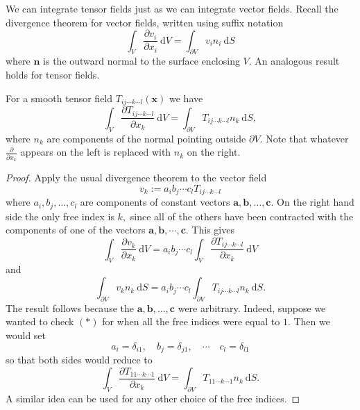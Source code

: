 We can integrate tensor fields just as we can integrate vector fields. Recall the divergence theorem for vector fields, written using suffix notation
\[
\int_{V} \frac{\partial v_{i}}{\partial x_{i}} \mathrm{~d} V=\int_{\partial V} v_{i} n_{i} \mathrm{~d} S
\]
where $\mathbf{n}$ is the outward normal to the surface enclosing $V$. An analogous result holds for
tensor fields.
\begin{proposition}
    For a smooth tensor field $T_{i j \cdots k \cdots l}(\mathbf{x})$ we have
    \[
    \int_{V} \frac{\partial T_{i j \cdots k \cdots l}}{\partial x_{k}} \mathrm{~d} V=\int_{\partial V} T_{i j \cdots k \cdots l} n_{k} \mathrm{~d} S,\tag{$*$}
    \]
    where $ n_k $ are components of the normal pointing outside $ \partial V $. Note that whatever $\frac{\partial}{\partial x_{k}}$ appears on the left is replaced with $n_{k}$ on the right.
\end{proposition}
\begin{proof}
    Apply the usual divergence theorem to the vector field
    \[
    v_{k}:=a_{i} b_{j} \cdots c_{l} T_{i j \cdots k \cdots l}
    \]
    where $a_{i}, b_{j}, \ldots, c_{l}$ are components of constant vectors $\mathbf{a}, \mathbf{b}, \ldots, \mathbf{c} .$ On the right hand side the only free index is $k,$ since all of the others have been contracted with the components of one of the vectors $\mathbf{a}, \mathbf{b}, \cdots, \mathbf{c}$. This gives
    \[
    \int_{V} \frac{\partial v_{k}}{\partial x_{k}} \mathrm{~d} V=a_{i} b_{j} \cdots c_{l} \int_{V} \frac{\partial T_{i j \cdots k \cdots l}}{\partial x_{k}} \mathrm{~d} V
    \]
    and
    \[
    \int_{\partial V} v_{k} n_{k} \mathrm{~d} S=a_{i} b_{j} \cdots c_{l} \int_{\partial V} T_{i j \cdots k \cdots l} n_{k} \mathrm{~d} S .
    \]
    The result follows because the $\mathbf{a}, \mathbf{b}, \ldots, \mathbf{c}$ were arbitrary. Indeed, suppose we wanted to check $(*)$ for when all the free indices were equal to $1 .$ Then we would set
    \[
    a_{i}=\delta_{i 1}, \quad b_{j}=\delta_{j 1}, \quad \cdots \quad c_{l}=\delta_{l 1}
    \]
    so that both sides would reduce to
    \[
    \int_{V} \frac{\partial T_{11 \cdots k \cdots 1}}{\partial x_{k}} \mathrm{~d} V=\int_{\partial V} T_{11 \cdots k \cdots 1} n_{k} \mathrm{~d} S .
    \]
    A similar idea can be used for any other choice of the free indices.
\end{proof}